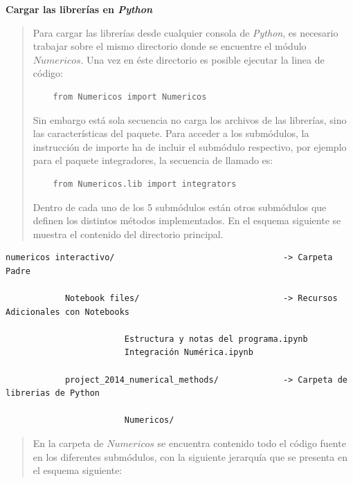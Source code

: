 \documentclass[letterpaper,10pt,oneside]{sphinxmanual}
\theoremstyle{plain}%
\theoremstyle{definition}%
\theoremstyle{remark}%
\begin{document}
\textbf{Cargar las librerías en \textit{Python}}
\begin{quote}
Para cargar las librerías desde cualquier consola de \textit{Python}, es necesario trabajar sobre el mismo directorio donde se encuentre el módulo $Numericos$. Una vez en éste directorio es posible ejecutar la linea de código:

	\begin{verbatim}
	from Numericos import Numericos
	\end{verbatim}
	
Sin embargo está sola secuencia no carga los archivos de las librerías, sino las características del paquete. Para acceder a los submódulos, la instrucción de importe ha de incluir el submódulo respectivo, por ejemplo para el paquete integradores, la secuencia de llamado es:

	\begin{verbatim}
	from Numericos.lib import integrators
	\end{verbatim}

Dentro de cada uno de los 5 submódulos están otros submódulos que definen los distintos métodos implementados. En el esquema siguiente se muestra el contenido del directorio principal.
\end{quote}

\begin{verbatim}
numericos interactivo/                                  -> Carpeta Padre
                         					
            Notebook files/               				-> Recursos Adicionales con Notebooks

                        Estructura y notas del programa.ipynb
                        Integración Numérica.ipynb
						    
            project_2014_numerical_methods/    			-> Carpeta de librerias de Python
		                  		
                        Numericos/
\end{verbatim}	

\begin{quote}
En la carpeta de $Numericos$ se encuentra contenido todo el código fuente en los diferentes submódulos, con la siguiente jerarquía que se presenta en el esquema siguiente:
\end{quote}
\end{document}
